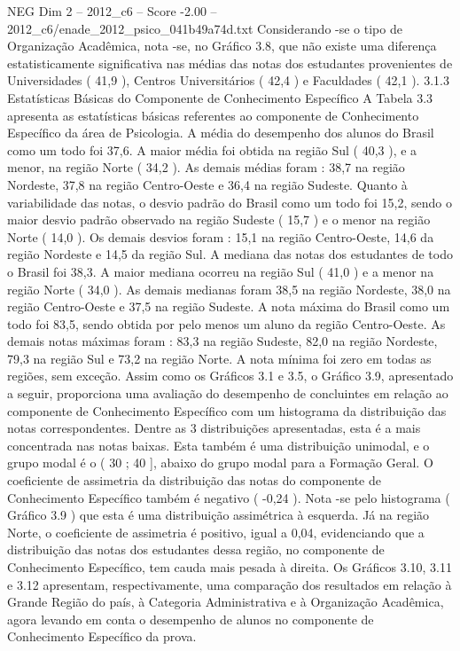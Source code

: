 \begin{textsample}{NEG Dim 2 – 2012\_c6 – Score -2.00 – 2012\_c6/enade\_2012\_psico\_041b49a74d.txt}
Considerando -se o tipo de Organização Acadêmica, nota -se, no Gráfico 3.8, que não existe uma diferença estatisticamente significativa nas médias das notas dos estudantes provenientes de Universidades ( 41,9 ), Centros Universitários ( 42,4 ) e Faculdades ( 42,1 ). 3.1.3 Estatísticas Básicas do Componente de Conhecimento Específico A Tabela 3.3 apresenta as estatísticas básicas referentes ao componente de Conhecimento Específico da área de Psicologia.
A média do desempenho dos alunos do Brasil como um todo foi 37,6.
A maior média foi obtida na região Sul ( 40,3 ), e a menor, na região Norte ( 34,2 ).
As demais médias foram : 38,7 na região Nordeste, 37,8 na região Centro-Oeste e 36,4 na região Sudeste.
Quanto à variabilidade das notas, o desvio padrão do Brasil como um todo foi 15,2, sendo o maior desvio padrão observado na região Sudeste ( 15,7 ) e o menor na região Norte ( 14,0 ).
Os demais desvios foram : 15,1 na região Centro-Oeste, 14,6 da região Nordeste e 14,5 da região Sul.
A mediana das notas dos estudantes de todo o Brasil foi 38,3.
A maior mediana ocorreu na região Sul ( 41,0 ) e a menor na região Norte ( 34,0 ).
As demais medianas foram 38,5 na região Nordeste, 38,0 na região Centro-Oeste e 37,5 na região Sudeste.
A nota máxima do Brasil como um todo foi 83,5, sendo obtida por pelo menos um aluno da região Centro-Oeste.
As demais notas máximas foram : 83,3 na região Sudeste, 82,0 na região Nordeste, 79,3 na região Sul e 73,2 na região Norte.
A nota mínima foi zero em todas as regiões, sem exceção.
Assim como os Gráficos 3.1 e 3.5, o Gráfico 3.9, apresentado a seguir, proporciona uma avaliação do desempenho de concluintes em relação ao componente de Conhecimento Específico com um histograma da distribuição das notas correspondentes.
Dentre as 3 distribuições apresentadas, esta é a mais concentrada nas notas baixas.
Esta também é uma distribuição unimodal, e o grupo modal é o ( 30 ; 40 ], abaixo do grupo modal para a Formação Geral.
O coeficiente de assimetria da distribuição das notas do componente de Conhecimento Específico também é negativo ( -0,24 ).
Nota -se pelo histograma ( Gráfico 3.9 ) que esta é uma distribuição assimétrica à esquerda.
Já na região Norte, o coeficiente de assimetria é positivo, igual a 0,04, evidenciando que a distribuição das notas dos estudantes dessa região, no componente de Conhecimento Específico, tem cauda mais pesada à direita.
Os Gráficos 3.10, 3.11 e 3.12 apresentam, respectivamente, uma comparação dos resultados em relação à Grande Região do país, à Categoria Administrativa e à Organização Acadêmica, agora levando em conta o desempenho de alunos no componente de Conhecimento Específico da prova.

\end{textsample}

